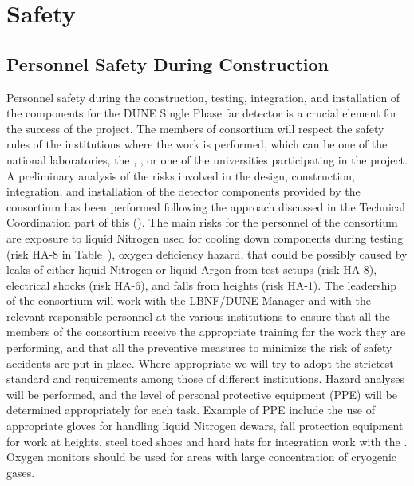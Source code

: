 \section{Safety}
\label{sec:fdsp-tpcelec-safety}

\subsection{Personnel Safety During Construction}
\label{sec:fdsp-tpcelec-safety-personnel}

Personnel safety during the construction, testing, integration,
and installation of the  components for the DUNE
Single Phase far detector is a crucial element for the success
of the project. The members of  consortium will
respect the safety rules of the institutions where the work is
performed, which can be one of the national laboratories, the , \surf,
or one of the universities participating in the project. A
preliminary analysis of the risks involved in the design,
construction, integration, and installation of the detector
components provided by the  consortium has been
performed following the approach discussed in the Technical
Coordination part of this  ().
The main risks for the personnel of the consortium are exposure to
liquid Nitrogen used for cooling down components during testing (risk HA-8
in Table~),
oxygen deficiency hazard, that could be possibly caused by leaks
of either liquid Nitrogen or liquid Argon from test setups (risk HA-8),
electrical shocks (risk HA-6), and falls from heights (risk HA-1). The leadership of the
 consortium will work with the LBNF/DUNE
 Manager and with the relevant responsible personnel at the
various institutions to ensure that all the members of the
consortium receive the appropriate training for the work they
are performing, and that all the preventive measures to minimize
the risk of safety accidents are put in place. Where appropriate
we will try to adopt the strictest standard and requirements among
those of different institutions. Hazard analyses will be performed,
and the level of personal protective equipment (PPE) will be determined
appropriately for each task. Example of PPE include the use of
appropriate gloves for handling liquid Nitrogen dewars, fall
protection equipment for work at heights, steel toed shoes and
hard hats for integration work with the . Oxygen
monitors should be used for areas with large concentration of
cryogenic gases.

